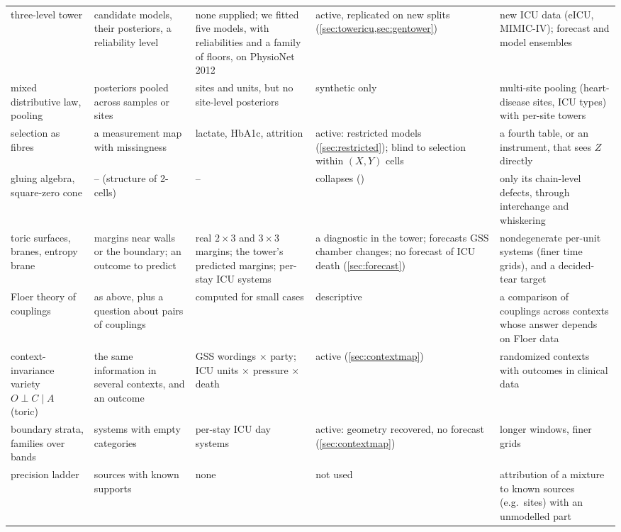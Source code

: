 \documentclass[11pt]{article}
\theoremstyle{definition}
\theoremstyle{remark}
\begin{document}
{\begin{longtable}{>{\raggedright}p{2.6cm}>{\raggedright}p{3.4cm}>{\raggedright}p{3.2cm}>{\raggedright}p{1.9cm}>{\raggedright\arraybackslash}p{4.0cm}}
three-level tower \cite{Tower} & candidate models, their posteriors, a reliability level & none supplied; we fitted five models, with reliabilities and a family of floors, on PhysioNet 2012 & active, replicated on new splits (\cref{sec:towericu,sec:gentower}) & new ICU data (eICU, MIMIC-IV); forecast and model ensembles\\
mixed distributive law, pooling & posteriors pooled across samples or sites & sites and units, but no site-level posteriors & synthetic only & multi-site pooling (heart-disease sites, ICU types) with per-site towers\\
selection as fibres & a measurement map with missingness & lactate, HbA1c, attrition & active: restricted models (\cref{sec:restricted}); blind to selection within $(X,Y)$ cells & a fourth table, or an instrument, that sees $Z$ directly\\
gluing algebra, square-zero cone \cite{Algebras} & -- (structure of 2-cells) & -- & collapses (\cite[Cor.~5.3]{Algebras}) & only its chain-level defects, through interchange and whiskering\\
toric surfaces, branes, entropy brane \cite{Bridges} & margins near walls or the boundary; an outcome to predict & real $2\times3$ and $3\times3$ margins; the tower's predicted margins; per-stay ICU systems & a diagnostic in the tower; forecasts GSS chamber changes; no forecast of ICU death (\cref{sec:forecast}) & nondegenerate per-unit systems (finer time grids), and a decided-tear target\\
Floer theory of couplings \cite{Bridges} & as above, plus a question about pairs of couplings & computed for small cases & descriptive & a comparison of couplings across contexts whose answer depends on Floer data\\
context-invariance variety $O\perp C\mid A$ (toric) & the same information in several contexts, and an outcome & GSS wordings $\times$ party; ICU units $\times$ pressure $\times$ death & active (\cref{sec:contextmap}) & randomized contexts with outcomes in clinical data\\
boundary strata, families over bands & systems with empty categories & per-stay ICU day systems & active: geometry recovered, no forecast (\cref{sec:contextmap}) & longer windows, finer grids\\
precision ladder \cite{Attribution} & sources with known supports & none & not used & attribution of a mixture to known sources (e.g.\ sites) with an unmodelled part\\
\end{longtable}}
\end{document}
